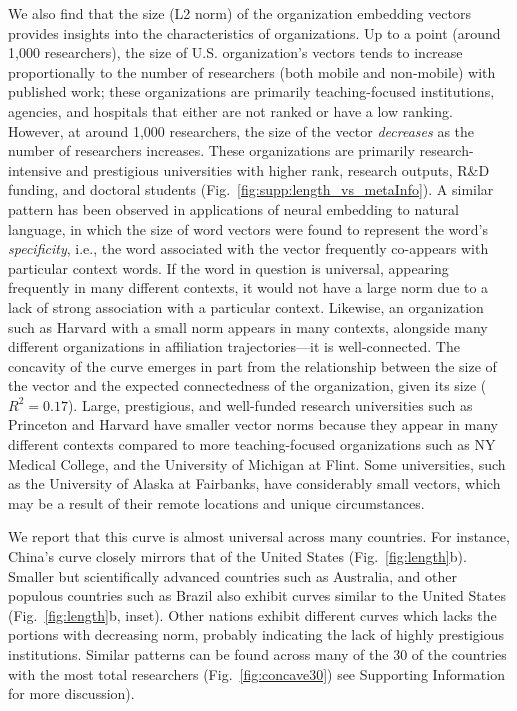 \documentclass[12pt]{article} %
\def\SI{Supporting Information}
\begin{document}
We also find that the size (L2 norm) of the organization embedding vectors provides insights into the characteristics of organizations.
Up to a point (around 1,000 researchers), the size of U.S. organization's vectors tends to increase proportionally to the number of researchers (both mobile and non-mobile) with published work;
these organizations are primarily teaching-focused institutions, agencies, and hospitals that either are not ranked or have a low ranking.
However, at around 1,000 researchers, the size of the vector \emph{decreases} as the number of researchers increases.
These organizations are primarily research-intensive and prestigious universities with higher rank, research outputs, R\&D funding, and doctoral students (Fig.~\ref{fig:supp:length_vs_metaInfo}).
A similar pattern has been observed in applications of neural embedding to natural language, in which the size of word vectors were found to represent the word's \emph{specificity}, i.e., the word associated with the vector frequently co-appears with particular context words\autocite{schakel2015measuring}. 
If the word in question is universal, appearing frequently in many different contexts, it would not have a large norm due to a lack of strong association with a particular context.
Likewise, an organization such as Harvard with a small norm appears in many contexts, alongside many different organizations in affiliation trajectories---it is well-connected.
The concavity of the curve emerges in part from the relationship between the size of the vector and the expected connectedness of the organization, given its size ($R^{2} = 0.17$).
Large, prestigious, and well-funded research universities such as Princeton and Harvard have smaller vector norms because they appear in many different contexts compared to more teaching-focused organizations such as NY Medical College, and the University of Michigan at Flint.
Some universities, such as the University of Alaska at Fairbanks, have considerably small vectors, which may be a result of their remote locations and unique circumstances.


We report that this curve is almost universal across many countries. 
For instance, China's curve closely mirrors that of the United States (Fig.~\ref{fig:length}b).
Smaller but scientifically advanced countries such as Australia, and other populous countries such as Brazil also exhibit curves similar to the United States (Fig.~\ref{fig:length}b, inset).
Other nations exhibit different curves which lacks the portions with decreasing norm, probably indicating the lack of highly prestigious institutions.
Similar patterns can be found across many of the 30 of the countries with the most total researchers (Fig.~\ref{fig:concave30}) see \SI{} for more discussion).
\end{document}
